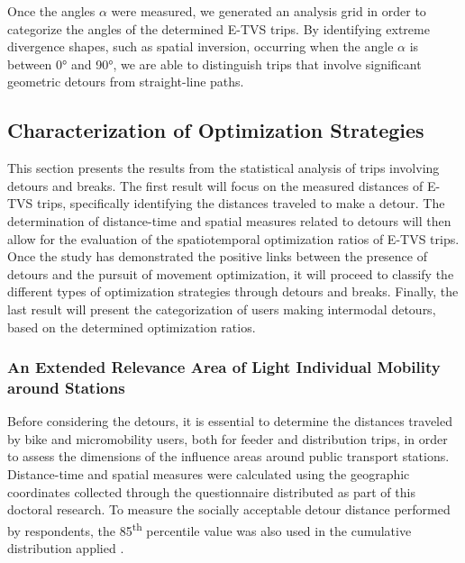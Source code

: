 \begin{refsegment}
Once the angles $\alpha$ were measured, we generated an analysis grid in order to categorize the angles of the determined \acrshort{E-TVS} trips. By identifying extreme divergence shapes, such as spatial inversion, occurring when the angle $\alpha$ is between 0° and 90°, we are able to distinguish trips that involve significant geometric detours from straight-line paths.%

\subsection{Characterization of Optimization Strategies
    \label{chap5:strategies-optimisation}
}

This section presents the results from the statistical analysis of trips involving detours and breaks. The first result will focus on the measured distances of \acrshort{E-TVS} trips, specifically identifying the distances traveled to make a detour. The determination of distance-time and spatial measures related to detours will then allow for the evaluation of the spatiotemporal optimization ratios of \acrshort{E-TVS} trips. Once the study has demonstrated the positive links between the presence of detours and the pursuit of movement optimization, it will proceed to classify the different types of optimization strategies through detours and breaks. Finally, the last result will present the categorization of users making intermodal detours, based on the determined optimization ratios.%

\subsubsection*{An Extended Relevance Area of Light Individual Mobility around Stations
    \label{chap5:extension-accrue-quartier-gare}
}

Before considering the detours, it is essential to determine the distances traveled by bike and micromobility users, both for feeder and distribution trips, in order to assess the dimensions of the influence areas around public transport stations. Distance-time and spatial measures were calculated using the geographic coordinates collected through the questionnaire distributed as part of this doctoral research. To measure the socially acceptable detour distance performed by respondents, the 85\textsuperscript{th} percentile value was also used in the cumulative distribution applied \textcolor{blue}{\autocite[982]{lee_bicycle-based_2016}}.%


\end{refsegment}
